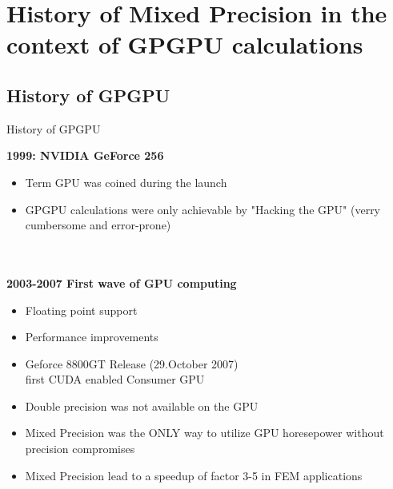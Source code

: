 \documentclass[10pt]{beamer}
\begin{document}

\section{History of Mixed Precision in the context of GPGPU calculations}
\subsection{History of GPGPU}
\begin{frame}{History of GPGPU}

	\textbf{1999: NVIDIA GeForce 256}\\
	\begin{itemize}
	\item Term GPU was coined during the launch
	\item GPGPU calculations were only achievable by "Hacking the GPU" 
			(verry cumbersome and error-prone)
	\end{itemize}
~\\~\\
\textbf{2003-2007 First wave of GPU computing}
\begin{itemize}
\item Floating point support
\item Performance improvements
\item Geforce 8800GT Release (29.October 2007)\\
	first CUDA enabled Consumer GPU
\item Double precision was not available on the GPU
\item Mixed Precision was the ONLY way to utilize GPU horesepower
	without precision compromises
\item Mixed Precision lead to a speedup of factor 3-5 in FEM applications %
\end{itemize}
\end{frame}
\end{document}
